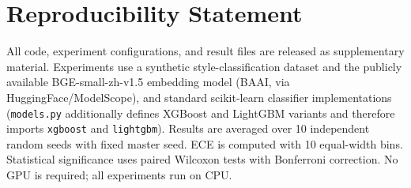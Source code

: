 \documentclass[11pt]{article}
\begin{document}
\section*{Reproducibility Statement}

All code, experiment configurations, and result files are released as supplementary material. Experiments use a synthetic style-classification dataset and the publicly available BGE-small-zh-v1.5 embedding model (BAAI, via HuggingFace/ModelScope), and standard scikit-learn classifier implementations (\texttt{models.py} additionally defines XGBoost and LightGBM variants and therefore imports \texttt{xgboost} and \texttt{lightgbm}). Results are averaged over 10 independent random seeds with fixed master seed. ECE is computed with 10 equal-width bins. Statistical significance uses paired Wilcoxon tests with Bonferroni correction. No GPU is required; all experiments run on CPU.



\end{document}
